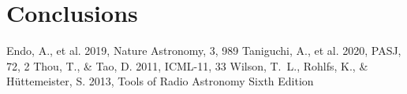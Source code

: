 \documentclass[a4paper,10pt,oneside,twocolumn,notitlepage,final]{jarticle}
\begin{document}
\section{Conclusions}

\small
\begin{thebibliography}{99}
    Endo, A., et al. 2019, Nature Astronomy, 3, 989
    Taniguchi, A., et al. 2020, PASJ, 72, 2
    Thou, T., \& Tao, D. 2011, ICML-11, 33
    Wilson, T.~L., Rohlfs, K., \& H\"{u}ttemeister, S. 2013, Tools of Radio Astronomy Sixth Edition
\end{thebibliography}
\end{document}
